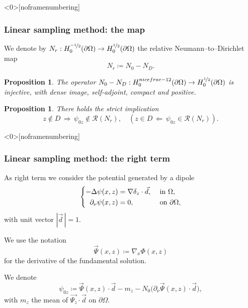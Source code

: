 \documentclass[10pt,xcolor={dvipsnames}]{beamer}
\newtheorem{proposition}[subsection]{Proposition}
\theoremstyle{plain}
\theoremstyle{plain}
\begin{document}
\begin{frame}<0>[noframenumbering]
 \frametitle{Linear sampling method: the map}
We denote by ${N_r}:H_0^{\nicefrac{-1}{2}}(\partial \Omega)\to H_0^{\nicefrac{1}{2}}(\partial \Omega)$
the {\color{blue} relative} Neumann--to--Dirichlet map
\begin{equation}
 {N_r} \coloneqq {N_0} - {N_D}.
\end{equation}
  \begin{proposition}
  The operator ${N_0} - {N_D}:H_0^{nicefrac{-1}{2}}(\partial \Omega)\to H_0^{\nicefrac{1}{2}}(\partial \Omega)$ 
  is injective, with dense image, self-adjoint, compact and positive.
 \end{proposition}
 \begin{proposition}
There holds the strict implication
\begin{equation}
 z\notin D \, \Longrightarrow \,\psi_{0z}\notin\mathcal{R}({N_r}), \quad(z\in D \, \Longleftarrow \,\psi_{0z}\in\mathcal{R}({N_r})).
\end{equation} 
\end{proposition}

\end{frame}
\begin{frame}<0>[noframenumbering]
 \frametitle{Linear sampling method: the right term}
  As right term we consider the potential generated by a dipole
 \begin{equation}
 \left\{
 \begin{aligned}
   -\Delta \psi(x,z) &= \nabla\delta_{z} \cdot \vec{d}, && \textup{ in }\Omega ,\\
   \partial_\nu\psi(x,z) &= 0, &&\textup{ on }\partial \Omega,
 \end{aligned}
 \right.
 \end{equation}
 with unit vector $|\vec{d}\,|=1$.
 \par
 We use the notation
 \begin{equation}
 \vec{\Psi}(x,z)\coloneqq\nabla_x\Phi(x,z) 
 \end{equation}
 for the derivative of the fundamental solution.
 \begin{definition}
 \label{def:lsm-psi}
 We denote
 \begin{equation}
 \psi_{0z} \coloneqq \vec{\Psi}(x,z)\cdot\vec{d} - m_z - N_0\bigl(\partial_\nu \vec{\Psi}(x,z) \cdot \vec{d}\bigr),
  \end{equation}
  with $m_z$ the mean of $\vec{\Psi_z}\cdot\vec{d}$ on $\partial \Omega$.
 \end{definition}
\end{frame}
\end{document}

